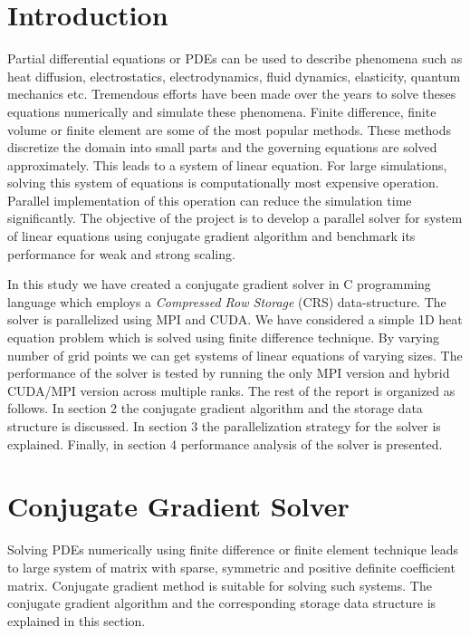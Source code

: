 \documentclass[sigplan,screen]{acmart}
\begin{document}
\section{Introduction}
Partial differential equations or PDEs can be used to describe phenomena such as heat diffusion, electrostatics, electrodynamics, fluid dynamics, elasticity, quantum mechanics etc. Tremendous efforts have been made over the years to solve theses equations numerically and simulate these phenomena. Finite difference, finite volume or finite element are some of the most popular methods. These methods discretize the domain into small parts and the governing equations are solved approximately. This leads to a system of linear equation. For large simulations, solving this system of equations is computationally most expensive operation. Parallel implementation of this operation can reduce the simulation time significantly. The objective of the project is to develop a parallel solver for system of linear equations using conjugate gradient algorithm and benchmark its performance for weak and strong scaling.

In this study we have created a conjugate gradient solver in C programming language which employs a \emph{Compressed Row Storage} (CRS) data-structure. The solver is parallelized using MPI and CUDA. We have considered a simple 1D heat equation problem which is solved using finite difference technique. By varying number of grid points we can get systems of linear equations of varying sizes. The performance of the solver is tested by running the only MPI version and hybrid CUDA/MPI version across multiple ranks. The rest of the report is organized as follows. In section 2 the conjugate gradient algorithm and the storage data structure is discussed. In section 3 the parallelization strategy for the solver is explained. Finally, in section 4 performance analysis of the solver is presented. 

\section{Conjugate Gradient Solver}
Solving PDEs numerically using finite difference or finite element technique leads to large system of matrix with sparse, symmetric and positive definite coefficient matrix. Conjugate gradient method \cite{conjugate} is suitable for solving such systems. The conjugate gradient algorithm and the corresponding storage data structure is explained in this section. 
\end{document}
